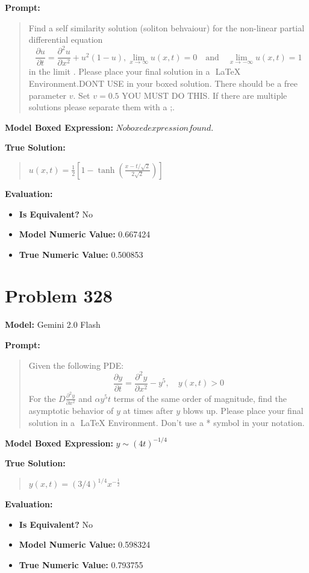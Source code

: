 \documentclass{article}
\begin{document}
{\textbf{Prompt:}
\begin{quote}
Find a self similarity solution (soliton behvaiour) for the non-linear partial differential equation $$ \frac{\partial u}{\partial t} = \frac{\partial^2 u}{\partial x^2} + u^2 (1-u), \lim_{x \to \infty} u(x, t) = 0 \quad \text{and} \quad \lim_{x \to -\infty} u(x, t) = 1 $$ in the limit . Please place your final solution in a $\boxed{}$ LaTeX Environment.DONT USE \operatorname in your boxed solution. There should be a free parameter $v$. Set $v=0.5$ YOU MUST DO THIS. If there are multiple solutions please separate them with a ;.
\end{quote}
\textbf{Model Boxed Expression:} $No boxed expression found.$

\textbf{True Solution:}
\begin{quote}
$u(x, t) = \frac{1}{2} \left[ 1 - \tanh\left( \frac{x - t/\sqrt{2}}{2\sqrt{2}} \right) \right]$
\end{quote}

\textbf{Evaluation:}
\begin{itemize}
\item \textbf{Is Equivalent?} No
\item \textbf{Model Numeric Value:} 0.667424
\item \textbf{True Numeric Value:} 0.500853
\end{itemize}
\vspace{1cm}
\section*{Problem 328}
\textbf{Model:} Gemini 2.0 Flash

\textbf{Prompt:}
\begin{quote}
Given the following PDE:$$\frac{\partial y}{\partial t} = \frac{\partial^2y}{\partial x^2} - y^5, \quad y(x,t)>0$$For the $D\frac{\partial^2y}{\partial x^2}$ and $ \alpha y^5 t$ terms of the same order of magnitude, find the asymptotic behavior of $y$ at times after $y$ blows up. Please place your final solution in a $\boxed{}$ LaTeX Environment. Don't use a * symbol in your notation.
\end{quote}
\textbf{Model Boxed Expression:} $y \sim (4t)^{-1/4}$

\textbf{True Solution:}
\begin{quote}
$y(x,t) = (3/4)^{1/4} x^{-\frac{1}{2}}$
\end{quote}

\textbf{Evaluation:}
\begin{itemize}
\item \textbf{Is Equivalent?} No
\item \textbf{Model Numeric Value:} 0.598324
\item \textbf{True Numeric Value:} 0.793755
\end{itemize}
\vspace{1cm}
}
\end{document}
